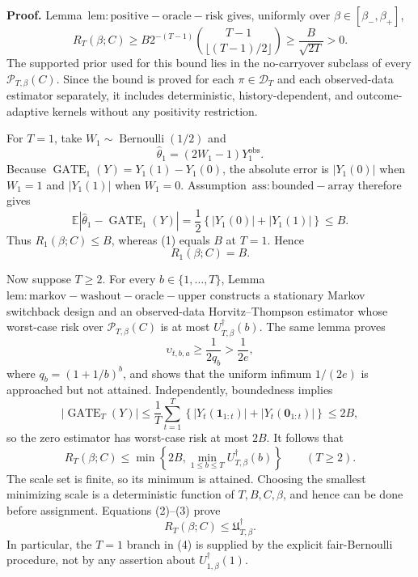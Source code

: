 \textbf{Proof.} Lemma~\(\mathrm{lem:positive-oracle-risk}\) gives, uniformly over \(\beta\in[\beta_-,\beta_+]\),
\[
R_T(\beta;C)\ge B2^{-(T-1)}\binom{T-1}{\lfloor(T-1)/2\rfloor}\ge \frac{B}{\sqrt{2T}}>0.
\tag{1}
\]
The supported prior used for this bound lies in the no-carryover subclass of every \(\mathcal P_{T,\beta}(C)\). Since the bound is proved for each \(\pi\in\mathcal D_T\) and each observed-data estimator separately, it includes deterministic, history-dependent, and outcome-adaptive kernels without any positivity restriction.

For \(T=1\), take \(W_1\sim\operatorname{Bernoulli}(1/2)\) and
\[
\widehat\theta_1=(2W_1-1)Y_1^{\mathrm{obs}}.
\]
Because \(\operatorname{GATE}_1(Y)=Y_1(1)-Y_1(0)\), the absolute error is \(\lvert Y_1(0)\rvert\) when \(W_1=1\) and \(\lvert Y_1(1)\rvert\) when \(W_1=0\). Assumption~\(\mathrm{ass:bounded-array}\) therefore gives
\[
\mathbb E\left\lvert\widehat\theta_1-\operatorname{GATE}_1(Y)\right\rvert
=\frac12\left\{\lvert Y_1(0)\rvert+\lvert Y_1(1)\rvert\right\}\le B.
\]
Thus \(R_1(\beta;C)\le B\), whereas (1) equals \(B\) at \(T=1\). Hence
\[
R_1(\beta;C)=B.
\tag{2}
\]

Now suppose \(T\ge2\). For every \(b\in\{1,\ldots,T\}\), Lemma~\(\mathrm{lem:markov-washout-oracle-upper}\) constructs a stationary Markov switchback design and an observed-data Horvitz--Thompson estimator whose worst-case risk over \(\mathcal P_{T,\beta}(C)\) is at most \(U_{T,\beta}^{\dagger}(b)\). The same lemma proves
\[
\upsilon_{t,b,a}\ge\frac{1}{2q_b}>\frac{1}{2e},
\]
where \(q_b=(1+1/b)^b\), and shows that the uniform infimum \(1/(2e)\) is approached but not attained. Independently, boundedness implies
\[
\left\lvert\operatorname{GATE}_T(Y)\right\rvert
\le \frac1T\sum_{t=1}^T\left\{\lvert Y_t(\mathbf1_{1:t})\rvert+\lvert Y_t(\mathbf0_{1:t})\rvert\right\}
\le2B,
\]
so the zero estimator has worst-case risk at most \(2B\). It follows that
\[
R_T(\beta;C)
\le \min\left\{2B,\min_{1\le b\le T}U_{T,\beta}^{\dagger}(b)\right\}
\qquad(T\ge2).
\tag{3}
\]
The scale set is finite, so its minimum is attained. Choosing the smallest minimizing scale is a deterministic function of \(T,B,C,\beta\), and hence can be done before assignment. Equations (2)--(3) prove
\[
R_T(\beta;C)\le\mathfrak U_{T,\beta}^{\dagger}.
\tag{4}
\]
In particular, the \(T=1\) branch in (4) is supplied by the explicit fair-Bernoulli procedure, not by any assertion about \(U_{1,\beta}^{\dagger}(1)\).

